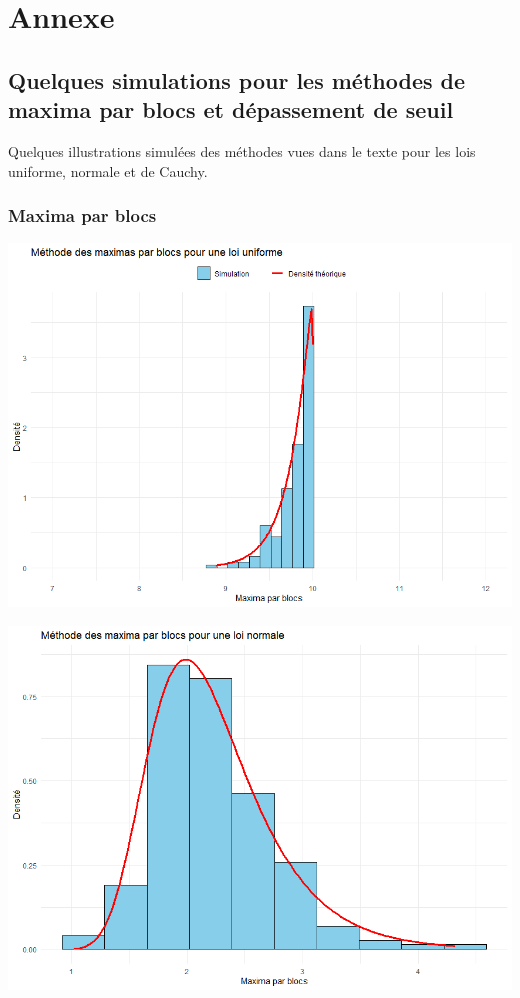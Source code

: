 \documentclass{article}
\theoremstyle{plain}
\theoremstyle{definition}
\theoremstyle{plain}
\begin{document}
\newpage
\section{Annexe}
\subsection{Quelques simulations pour les méthodes de maxima par blocs et dépassement de seuil}

\noindent Quelques illustrations simulées des méthodes vues dans le texte pour les lois uniforme, normale et de Cauchy. \\

\subsubsection{Maxima par blocs}

\begin{center}
	\includegraphics[scale=0.60]{./images/MB_Uniforme} 
\end{center}

\begin{center}
	\includegraphics[scale=0.70]{./images/MB_Normale} 
\end{center}
\end{document}
